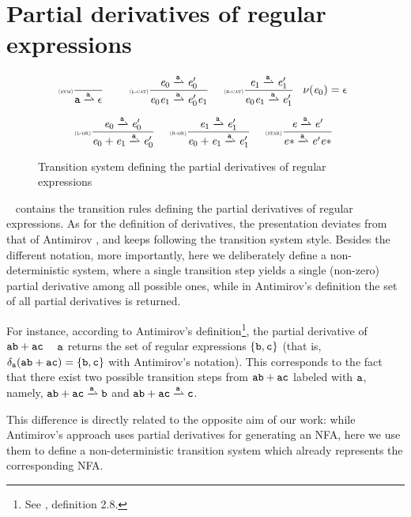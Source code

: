 \section{Partial derivatives of regular expressions}\label{sec:parDer}

\begin{figure}
 $$
  \begin{array}{c}
   \Rule{sym}{}{\sym\parDer{\sym}\eps}\quad
   \Rule{l-cat}{\re_0\parDer{\sym}\re'_0}{\re_0\catop\re_1\parDer{\sym}\re'_0\catop\re_1}{}\quad
   \Rule{r-cat}{\re_1\parDer{\sym}\re'_1}{\re_0\catop\re_1\parDer{\sym}\re'_1}{\hasEps{\re_0}=\eps} \\[4ex]
   \Rule{l-or}{\re_0\parDer{\sym}\re'_0}{\re_0\orop\re_1\parDer{\sym}\re'_0}{} \quad
   \Rule{r-or}{\re_1\parDer{\sym}\re'_1}{\re_0\orop\re_1\parDer{\sym}\re'_1}{} \quad
   \Rule{star}{\re\parDer{\sym}\re'}{\starop{\re}\parDer{\sym}\re'\catop\starop{\re}}{}
  \end{array}
 $$
 \caption{Transition system defining the partial derivatives of regular expressions}
 \label{fig:parDer}
\end{figure}

~ contains the transition rules defining the partial derivatives of regular expressions.
As for the definition of derivatives, the presentation deviates from that of Antimirov \cite{Antimirov96}, and keeps following the transition system style. Besides the different notation, more importantly, here we deliberately define a non-deterministic system, where a single transition step yields a single (non-zero) partial derivative among all possible ones, while in Antimirov's definition the set of all partial derivatives is returned.

For instance, according to Antimirov's definition\footnote{See \cite{Antimirov96}, definition 2.8.},
the partial derivative of $\mathtt {a} \mathtt {b} \mathbin{+} \mathtt {a}\mathtt {c}$ \wrt~ $\mathtt {a} $ returns the set of regular expressions $\{\mathtt {b},\mathtt {c}\}$ (that is, $\delta_{\mathtt {a}}(\mathtt {a}\mathtt {b} \mathbin{+} \mathtt {a}\mathtt {c})=\{\mathtt {b},\mathtt {c}\}$ with Antimirov's notation). This corresponds to the fact that there exist two possible transition steps from $\mathtt {a} \mathtt {b} \mathbin{+} \mathtt {a}\mathtt {c}$ labeled with $\mathtt {a} $, namely,
$\sym \asym \orop \sym\yasym\parDer{\sym}\asym$ and $\sym \asym \orop \sym \yasym\parDer{\sym}\yasym$.

This difference is directly related to the opposite aim of our work: while Antimirov's approach uses partial derivatives for generating an NFA, here
we use them to define a non-deterministic transition system which already represents the corresponding NFA.


